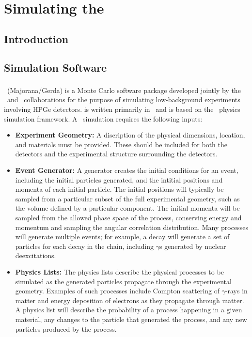 \documentclass[/main.tex]{subfiles}
\begin{document}
\textpages
\chapter{Simulating the \MJD}

\section{Introduction}


\section{Simulation Software}
\subsection{\Mage}
\Mage\ (Majorana/Gerda) \cite{mage2011} is a Monte Carlo software package developed jointly by the \MJ\ and \Gerda\ collaborations for the purpose of simulating low-background experiments involving HPGe detectors.
\Mage is written primarily in \cpp\ and is based on the \geant\ physics simulation framework\cite{geant2003}.
A \geant\ simulation requires the following inputs:
\begin{itemize}
\item{\textbf{Experiment Geometry:}}
  A discription of the physical dimensions, location, and materials must be provided.
  These should be included for both the detectors and the experimental structure surrounding the detectors.
\item{\textbf{Event Generator:}}
  A generator creates the initial conditions for an event, including the initial particles generated, and the intitial positions and momenta of each initial particle.
  The initial positions will typically be sampled from a particular subset of the full experimental geometry, such as the volume defined by a particular component.
  The initial momenta will be sampled from the allowed phase space of the process, conserving energy and momentum and sampling the angular correlation distribution.
  Many processes will generate multiple events; for example, a  decay will generate a set of particles for each decay in the chain, including $\gamma$s generated by nuclear deexcitations.
\item{\textbf{Physics Lists:}}
  The physics lists describe the physical processes to be simulated as the generated particles propagate through the experimental geometry.
  Examples of such processes include Compton scattering of $\gamma$-rays in matter and energy deposition of electrons as they propagate through matter.
  A physics list will describe the probability of a process happening in a given material, any changes to the particle that generated the process, and any new particles produced by the process.
\end{itemize}
\end{document}
